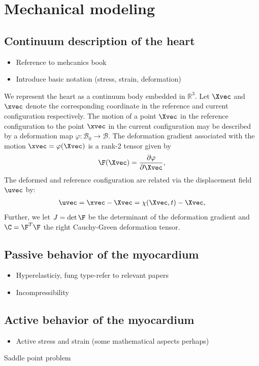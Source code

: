 \section{Mechanical modeling}

\subsection{Continuum description of the heart}

\begin{itemize}
  \item Reference to mehcanics book
  \item Introduce basic notation (stress, strain, deformation)
\end{itemize}

We represent the heart as a continuum body  embedded in
$\mathbb{R}^3$. Let $\Xvec$ and  $\xvec$ denote the corresponding
coordinate in the reference and current configuration respectively.
The motion of a point $\Xvec$ in the reference configuration to the
point $\xvec$ in the current configuration  may be described by a
deformation map  $\varphi :  \mathcal{B}_0  \rightarrow \mathcal{B}$.
The deformation gradient associated with the motion $\xvec =
\varphi(\Xvec)$ is a rank-2 tensor given by  
\begin{align}
\F(\Xvec) = \frac{\partial \varphi}{\partial \Xvec}, 
\end{align}
The deformed and reference configuration are related via the
displacement field $\uvec$ by: 
\begin{align}  
\uvec = \xvec-\Xvec = \chi( \Xvec, t) -\Xvec,
\end{align} 
Further, we let $J = \det \F$ be the determinant of the deformation gradient 
and $\C = \F^T\F$ the right Cauchy-Green deformation tensor.\cite{holzapfel2000nonlinear}




\subsection{Passive behavior of the myocardium}

\begin{itemize}
  \item Hyperelasticiy, fung type-refer to relevant papers
  \item Incompressibility
\end{itemize}



\subsection{Active behavior of the myocardium}


\begin{itemize}
  \item Active stress and strain (some mathematical aspects perhaps)
\end{itemize}



Saddle point problem

  

